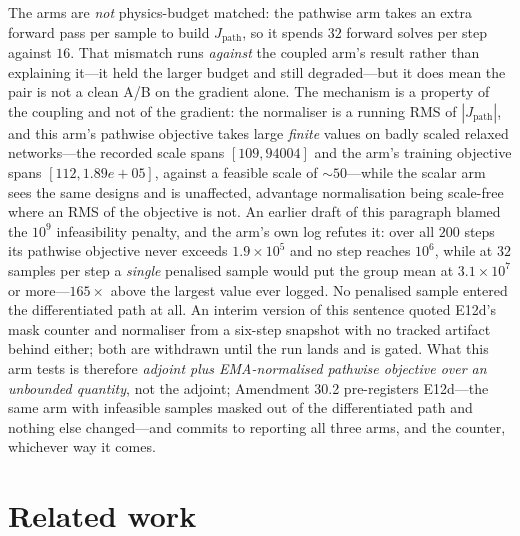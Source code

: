 \documentclass{article}
\newcommand{\Jpath}{J_{\mathrm{path}}}
\begin{document}
The arms are \emph{not} physics-budget matched: the pathwise arm takes an extra forward pass per
sample to build $\Jpath$, so it spends $32$ forward solves per step against $16$.  That mismatch
runs \emph{against} the coupled arm's result rather than explaining it---it held the larger budget
and still degraded---but it does mean the pair is not a clean A/B on the gradient alone.  The
mechanism is a property of the coupling and not of the gradient: the normaliser is a running RMS
of $|\Jpath|$, and this arm's pathwise objective takes large \emph{finite} values on badly scaled
relaxed networks---the recorded scale spans $[109, 94004]$ and the arm's training objective spans
$[112, 1.89e+05]$, against a feasible scale of ${\sim}50$---while the scalar arm sees the same
designs and is unaffected, advantage normalisation being scale-free where an RMS of the objective
is not.  An earlier draft of this paragraph blamed the $10^9$ infeasibility penalty, and the arm's own
log refutes it: over all $200$ steps its pathwise objective never exceeds $1.9\times10^5$ and no
step reaches $10^6$, while at $32$ samples per step a \emph{single} penalised sample would put the
group mean at $3.1\times10^7$ or more---$165\times$ above the largest value ever logged.  No
penalised sample entered the differentiated path at all.  An interim version of this sentence
quoted E12d's mask counter and normaliser from a six-step snapshot with no tracked artifact behind
either; both are withdrawn until the run lands and is gated.  What this arm tests is therefore
\emph{adjoint plus EMA-normalised pathwise objective over an unbounded quantity}, not the adjoint;
Amendment 30.2 pre-registers E12d---the same arm with infeasible samples masked out of the
differentiated path and nothing else changed---and commits to reporting all three arms, and the
counter, whichever way it comes.

\section{Related work}
\label{sec:related}
\end{document}
